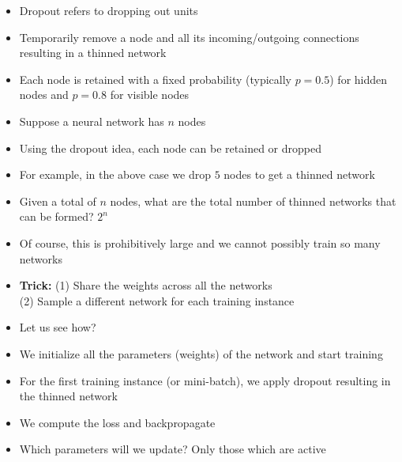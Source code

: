 \begin{frame}
	
	\hspace{2cm}
	\begin{itemize}
		\item Dropout refers to dropping out units
		\item<2-> Temporarily remove a node and all its incoming/outgoing connections resulting in a thinned network
		\item<3-> Each node is retained with a fixed probability (typically $p=0.5$) for hidden nodes and $p=0.8$ for visible nodes
	\end{itemize}				
\end{frame}
			
\begin{frame}			
	
	\hspace{2cm}
	
	\begin{itemize}
		\justifying
		\item<2-> Suppose a neural network has $n$ nodes
		\item<3-> Using the dropout idea, each node can be retained or dropped
		\item<4-> For example, in the above case we drop $5$ nodes to get a thinned network
		\item<5-> Given a total of $n$ nodes, what are the total number of thinned networks that can be formed?\onslide<6-> { $2^n$}
		\item<7-> Of course, this is prohibitively large and we cannot possibly train so many networks
		\item<8-> \textbf{Trick:} (1) Share the weights across all the networks \onslide<9-> {\\(2) Sample a different network for each training instance}
		\item<10-> Let us see how?	
	\end{itemize}
							
\end{frame}

\begin{frame}			
	
	\hspace{2cm}
	 {}
	\begin{itemize}
		\justifying
		\item<2-> We initialize all the parameters (weights) of the network and start training
		\item<3-> For the first training instance (or mini-batch), we apply dropout resulting in the thinned network
		\item<4-> We compute the loss and backpropagate
		\item<5-> Which parameters will we update? \onslide<6-> { Only those which are active}
	\end{itemize}
							
\end{frame}

